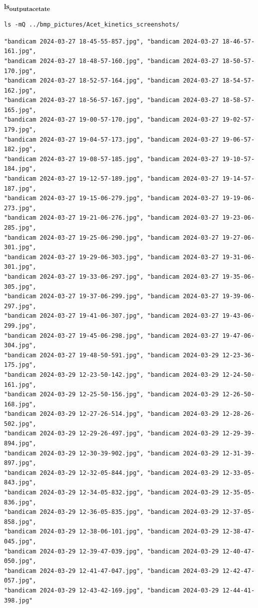 \documentclass[11pt]{article}
\begin{document}
\textbf{ls\textsubscript{output}\textsubscript{acetate}}
\begin{verbatim}
ls -mQ ../bmp_pictures/Acet_kinetics_screenshots/
\end{verbatim}

\begin{verbatim}
"bandicam 2024-03-27 18-45-55-857.jpg", "bandicam 2024-03-27 18-46-57-161.jpg",
"bandicam 2024-03-27 18-48-57-160.jpg", "bandicam 2024-03-27 18-50-57-170.jpg",
"bandicam 2024-03-27 18-52-57-164.jpg", "bandicam 2024-03-27 18-54-57-162.jpg",
"bandicam 2024-03-27 18-56-57-167.jpg", "bandicam 2024-03-27 18-58-57-165.jpg",
"bandicam 2024-03-27 19-00-57-170.jpg", "bandicam 2024-03-27 19-02-57-179.jpg",
"bandicam 2024-03-27 19-04-57-173.jpg", "bandicam 2024-03-27 19-06-57-182.jpg",
"bandicam 2024-03-27 19-08-57-185.jpg", "bandicam 2024-03-27 19-10-57-184.jpg",
"bandicam 2024-03-27 19-12-57-189.jpg", "bandicam 2024-03-27 19-14-57-187.jpg",
"bandicam 2024-03-27 19-15-06-279.jpg", "bandicam 2024-03-27 19-19-06-273.jpg",
"bandicam 2024-03-27 19-21-06-276.jpg", "bandicam 2024-03-27 19-23-06-285.jpg",
"bandicam 2024-03-27 19-25-06-290.jpg", "bandicam 2024-03-27 19-27-06-301.jpg",
"bandicam 2024-03-27 19-29-06-303.jpg", "bandicam 2024-03-27 19-31-06-301.jpg",
"bandicam 2024-03-27 19-33-06-297.jpg", "bandicam 2024-03-27 19-35-06-305.jpg",
"bandicam 2024-03-27 19-37-06-299.jpg", "bandicam 2024-03-27 19-39-06-297.jpg",
"bandicam 2024-03-27 19-41-06-307.jpg", "bandicam 2024-03-27 19-43-06-299.jpg",
"bandicam 2024-03-27 19-45-06-298.jpg", "bandicam 2024-03-27 19-47-06-304.jpg",
"bandicam 2024-03-27 19-48-50-591.jpg", "bandicam 2024-03-29 12-23-36-175.jpg",
"bandicam 2024-03-29 12-23-50-142.jpg", "bandicam 2024-03-29 12-24-50-161.jpg",
"bandicam 2024-03-29 12-25-50-156.jpg", "bandicam 2024-03-29 12-26-50-168.jpg",
"bandicam 2024-03-29 12-27-26-514.jpg", "bandicam 2024-03-29 12-28-26-502.jpg",
"bandicam 2024-03-29 12-29-26-497.jpg", "bandicam 2024-03-29 12-29-39-894.jpg",
"bandicam 2024-03-29 12-30-39-902.jpg", "bandicam 2024-03-29 12-31-39-897.jpg",
"bandicam 2024-03-29 12-32-05-844.jpg", "bandicam 2024-03-29 12-33-05-843.jpg",
"bandicam 2024-03-29 12-34-05-832.jpg", "bandicam 2024-03-29 12-35-05-836.jpg",
"bandicam 2024-03-29 12-36-05-835.jpg", "bandicam 2024-03-29 12-37-05-858.jpg",
"bandicam 2024-03-29 12-38-06-101.jpg", "bandicam 2024-03-29 12-38-47-045.jpg",
"bandicam 2024-03-29 12-39-47-039.jpg", "bandicam 2024-03-29 12-40-47-050.jpg",
"bandicam 2024-03-29 12-41-47-047.jpg", "bandicam 2024-03-29 12-42-47-057.jpg",
"bandicam 2024-03-29 12-43-42-169.jpg", "bandicam 2024-03-29 12-44-41-398.jpg"
\end{verbatim}
\end{document}
